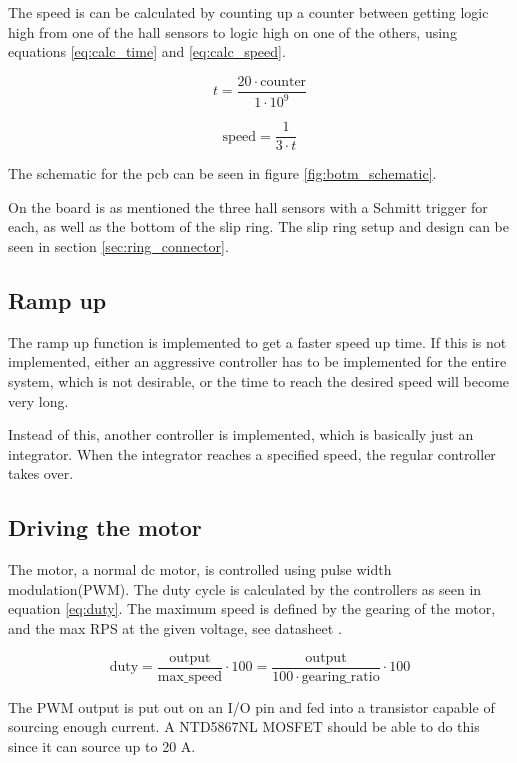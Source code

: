 The speed is can be calculated by counting up a counter between getting logic high from one of the hall sensors to  logic high on one of the others, using equations  \ref{eq:calc_time} and \ref{eq:calc_speed}.

\begin{equation} \label{eq:calc_time}
 t = \frac{20\cdot \text{counter}}{1\cdot 10^9}
\end{equation}

\begin{equation} \label{eq:calc_speed}
 \text{speed} = \frac{1}{3\cdot t}
\end{equation}

The schematic for the pcb can be seen in figure \ref{fig:botm_schematic}.

On the board is as mentioned the three hall sensors with a Schmitt trigger for each, as well as the bottom of the slip ring. The slip ring setup and design can be seen in section \ref{sec:ring_connector}. 


\subsection{Ramp up}

The ramp up function is implemented to get a faster speed up time.
If this is not implemented, either an aggressive controller has to be implemented for the entire system, which is not desirable, or the time to reach the desired speed will become very long.

Instead of this, another controller is implemented, which is basically just an integrator.
When the integrator reaches a specified speed, the regular controller takes over. 


\subsection{Driving the motor}

The motor, a normal dc motor, is controlled using pulse width modulation(PWM). The duty cycle is calculated by the controllers as seen in equation \ref{eq:duty}. The maximum speed is defined by the gearing of the motor, and the max RPS at the given voltage, see datasheet \cite{datasheet:motor}. 

\begin{equation}\label{eq:duty}
 \text{duty} = \frac{\text{output}}{\text{max\_speed}}\cdot 100 = \frac{\text{output}}{100\cdot \text{gearing\_ratio}}\cdot 100
\end{equation}

The PWM output is put out on an I/O pin and fed into a transistor capable of sourcing enough current.
A NTD5867NL MOSFET should be able to do this since it can source up to 20 A\cite{datasheet:mosfet}.
